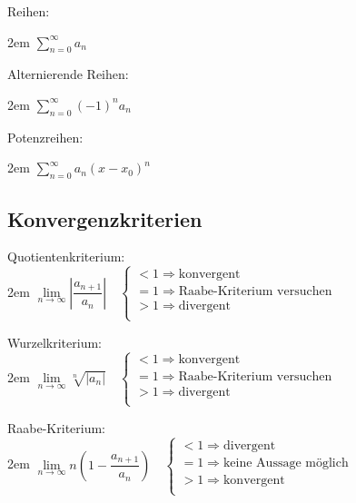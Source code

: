 \documentclass[11pt,final]{scrreprt}
\newcommand{\br} {\medskip\\}
\begin{document}
Reihen:

\begingroup
\leftskip2em 
$ \sum\limits_{n=0}^\infty a_n$\\
\par	
\endgroup 

Alternierende Reihen:

\begingroup
\leftskip2em 
$ \sum\limits_{n=0}^\infty (-1)^n a_n$\\
\par	
\endgroup 

Potenzreihen:

\begingroup
\leftskip2em 
$ \sum\limits_{n=0}^\infty a_n (x-x_0)^n$\\
\par	
\endgroup 

\subsection*{Konvergenzkriterien}
Quotientenkriterium:\\

\begingroup
\leftskip2em 
$  \lim\limits_{n\to\infty} \left| \dfrac{a_{n+1}}{a_{n}} \right|\hspace{1em}
\left\{
\begin{array}{l}
<1 \Rightarrow \text{konvergent}\\ 
=1 \Rightarrow \text{Raabe-Kriterium versuchen}\\
>1 \Rightarrow \text{divergent}\\
\end{array}
\right.
$\br
\par	
\endgroup 

Wurzelkriterium:\\

\begingroup
\leftskip2em 
$  \lim\limits_{n\to\infty} \sqrt[n]{|a_n|}\hspace{1em}
\left\{
\begin{array}{l}
<1 \Rightarrow \text{konvergent}\\ 
=1 \Rightarrow \text{Raabe-Kriterium versuchen}\\
>1 \Rightarrow \text{divergent}\\
\end{array}
\right.
$\\
\par	
\endgroup 

Raabe-Kriterium:\\

\begingroup
\leftskip2em 
$  \lim\limits_{n\to\infty} n \left( 1- \dfrac{a_{n+1}}{a_{n}} \right)\hspace{1em}
\left\{
\begin{array}{l}
<1 \Rightarrow \text{divergent}\\ 
=1 \Rightarrow \text{keine Aussage möglich}\\
>1 \Rightarrow \text{konvergent}\\
\end{array}
\right.
$\\
\par	
\endgroup 
\end{document}
